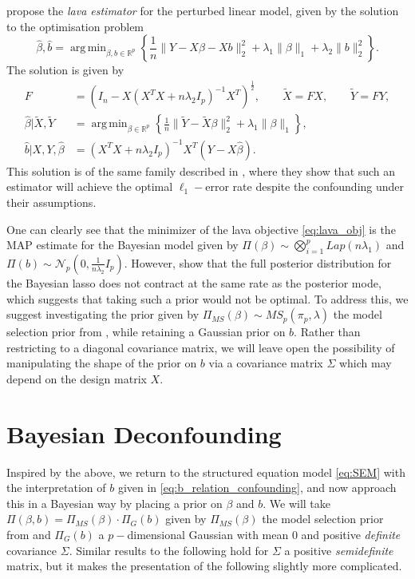 \documentclass[11pt]{article}
\newcommand{\Pims}{\Pi_{MS}}
\newcommand{\Pig}{\Pi_{G}}
\DeclareMathOperator*{\argmin}{arg\,min}
\numberwithin{equation}{section}
\begin{document}
\cite{Chernozhukov2017} propose the {\it lava estimator} for the perturbed linear model, given by the solution to the optimisation problem
\begin{equation}
\hat{\beta}, \hat{b} = \argmin_{\beta, b \in \mathbb{R}^p} \left\{\frac{1}{n}\|Y - X\beta - Xb\|_2^2 + \lambda_1\|\beta\|_1 + \lambda_2\|b\|_2^2 \right\}.\label{eq:lava_obj}
	\end{equation}
The solution is given by
\begin{align}
	F &= (I_n - X(X^TX + n\lambda_2I_p)^{-1}X^T)^{\frac{1}{2}}, \qquad\tilde{X} = FX, \qquad	 \tilde{Y} = FY, \nonumber \\
	 \hat{\beta} | \tilde{X}, \tilde{Y} &= \argmin_{\beta \in \mathbb{R}^p} \left\{\frac{1}{n}\|\tilde{Y} - \tilde{X}\beta\|_2^2 + \lambda_1\|\beta\|_1  \right\}, \nonumber\\
	 \hat{b} | X, Y, \hat{\beta} &= (X^TX + n\lambda_2I_p)^{-1}X^T(Y - X\hat{\beta}). \label{eq:b_sol_chern}
\end{align}
This solution is of the same family described in \cite{CBM2020}, where they show that such an estimator will achieve the optimal $\ell_1-$error rate despite the confounding under their assumptions.

One can clearly see that the minimizer of the lava objective \eqref{eq:lava_obj} is the MAP estimate for the Bayesian model given by $\Pi(\beta) \sim \bigotimes_{i=1}^p Lap(n\lambda_1)$ and $\Pi(b) \sim \mathcal{N}_p(0, \frac{1}{n\lambda_2}I_p)$. However, \cite{CS-HV2015} show that the full posterior distribution for the Bayesian lasso does not contract at the same rate as the posterior mode, which suggests that taking such a prior would not be optimal. To address this, we suggest investigating the prior given by $\Pims(\beta) \sim MS_p(\pi_p, \lambda)$ the model selection prior from \cite{CS-HV2015}, while retaining a Gaussian prior on $b$. Rather than restricting to a diagonal covariance matrix, we will leave open the possibility of manipulating the shape of the prior on $b$ via a covariance matrix $\Sigma$ which may depend on the design matrix $X$.

\section{Bayesian Deconfounding}
Inspired by the above, we return to the structured equation model \eqref{eq:SEM} with the interpretation of $b$ given in \eqref{eq:b_relation_confounding}, and now approach this in a Bayesian way by placing a prior on $\beta$ and $b$. We will take $\Pi(\beta, b) = \Pims(\beta)\cdot\Pig(b)$ given by $\Pims(\beta)$ the model selection prior from \cite{CS-HV2015} and $\Pig(b)$ a $p-$dimensional Gaussian with mean 0 and positive {\it definite} covariance $\Sigma$. Similar results to the following hold for $\Sigma$ a positive {\it semidefinite} matrix, but it makes the presentation of the following slightly more complicated.
\end{document}
